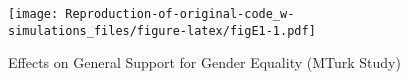 \documentclass[
]{article}
\newenvironment{Shaded}{\begin{snugshade}}{\end{snugshade}}
\newcommand{\FunctionTok}[1]{\textcolor[rgb]{0.00,0.00,0.00}{#1}}
\newcommand{\NormalTok}[1]{#1}
\newcommand{\SpecialCharTok}[1]{\textcolor[rgb]{0.00,0.00,0.00}{#1}}
\newcommand{\StringTok}[1]{\textcolor[rgb]{0.31,0.60,0.02}{#1}}
\begin{document}
\begin{figure}
\centering
\texttt{[image: Reproduction-of-original-code\_w-simulations\_files/figure-latex/figE1-1.pdf]}
\caption{Effects on General Support for Gender Equality (MTurk Study)}
\end{figure}

\begin{Shaded}
\end{Shaded}

\begin{table}[H]


\end{table}
\end{document}
